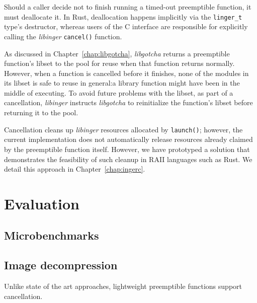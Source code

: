 Should a caller decide not to finish running a timed-out preemptible function, it
must deallocate it.  In Rust, deallocation happens implicitly via the
\texttt{linger\_t} type's destructor, whereas users of the C interface are responsible
for explicitly calling the \textit{libinger} \texttt{cancel()} function.

As discussed in Chapter~\ref{chap:libgotcha}, \textit{libgotcha} returns a
preemptible function's libset to the pool for reuse when that function returns
normally.  However, when a function is cancelled before it finishes, none of the
modules in its libset is safe to reuse in general:\@ a library function might have
been in the middle of executing.  To avoid future problems with the libset, as part
of a cancellation, \textit{libinger} instructs \textit{libgotcha} to reinitialize the
function's libset before returning it to the pool.

Cancellation cleans up \textit{libinger} resources allocated by \texttt{launch()};
however, the current implementation does not automatically release resources already
claimed by the preemptible function itself.  However, we have prototyped a solution
that demonstrates the feasibility of such cleanup in RAII languages such as Rust.
We detail this approach in Chapter~\ref{chap:ingerc}.


\section{Evaluation}




\subsection{Microbenchmarks}




\subsection{Image decompression}

Unlike state of the art approaches, lightweight preemptible functions support
cancellation.
\begin{sloppypar}

\end{sloppypar}
